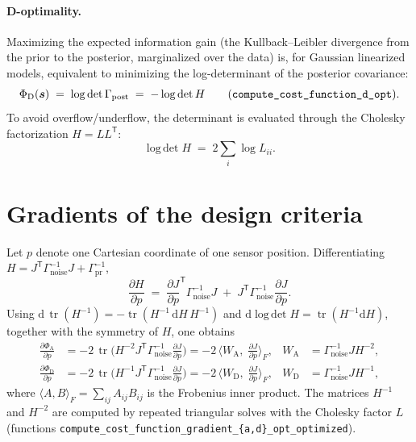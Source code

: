 \documentclass[11pt,a4paper]{article}
\newcommand{\tr}{\operatorname{tr}}
\newcommand{\logdet}{\operatorname{log\,det}}
\newcommand{\dd}{\mathrm{d}}
\newcommand{\T}{\mathsf{T}}
\newcommand{\Gnoise}{\Gamma_{\mathrm{noise}}}
\newcommand{\Gprior}{\Gamma_{\mathrm{pr}}}
\newcommand{\Gpost}{\Gamma_{\mathrm{post}}}
\newcommand{\code}[1]{\texttt{#1}}
\begin{document}
\paragraph{D-optimality.}
Maximizing the expected information gain (the Kullback--Leibler divergence from the prior to the
posterior, marginalized over the data) is, for Gaussian linearized models, equivalent to
minimizing the log-determinant of the posterior covariance:
\begin{equation}
\label{eq:dopt}
  \Phi_{\mathrm{D}}(\bm{s}) \;=\; \logdet \Gpost \;=\; -\logdet H
  \qquad \text{(\code{compute\_cost\_function\_d\_opt})}.
\end{equation}
To avoid overflow/underflow, the determinant is evaluated through the Cholesky factorization
$H = LL^\T$:
\begin{equation}
  \logdet H \;=\; 2 \sum_i \log L_{ii} .
\end{equation}

\section{Gradients of the design criteria}

Let $p$ denote one Cartesian coordinate of one sensor position. Differentiating
$H = J^\T \Gnoise^{-1} J + \Gprior^{-1}$,
\begin{equation}
  \frac{\partial H}{\partial p}
  \;=\;
  \frac{\partial J}{\partial p}^{\!\T} \Gnoise^{-1} J
  \;+\;
  J^\T \Gnoise^{-1} \frac{\partial J}{\partial p} .
\end{equation}
Using $\dd\, \tr(H^{-1}) = -\tr(H^{-1}\, \dd H\, H^{-1})$ and
$\dd \logdet H = \tr(H^{-1} \dd H)$, together with the symmetry of $H$, one obtains
\begin{align}
\label{eq:gradA}
  \frac{\partial \Phi_{\mathrm{A}}}{\partial p}
  &= -2\, \tr\!\Big( H^{-2} J^\T \Gnoise^{-1} \frac{\partial J}{\partial p} \Big)
   = -2\, \Big\langle W_{\mathrm{A}},\; \frac{\partial J}{\partial p} \Big\rangle_F,
  & W_{\mathrm{A}} &= \Gnoise^{-1} J H^{-2}, \\
\label{eq:gradD}
  \frac{\partial \Phi_{\mathrm{D}}}{\partial p}
  &= -2\, \tr\!\Big( H^{-1} J^\T \Gnoise^{-1} \frac{\partial J}{\partial p} \Big)
   = -2\, \Big\langle W_{\mathrm{D}},\; \frac{\partial J}{\partial p} \Big\rangle_F,
  & W_{\mathrm{D}} &= \Gnoise^{-1} J H^{-1},
\end{align}
where $\langle A, B\rangle_F = \sum_{ij} A_{ij} B_{ij}$ is the Frobenius inner product. The
matrices $H^{-1}$ and $H^{-2}$ are computed by repeated triangular solves with the Cholesky
factor $L$ (functions \code{compute\_cost\_function\_gradient\_\{a,d\}\_opt\_optimized}).
\end{document}
